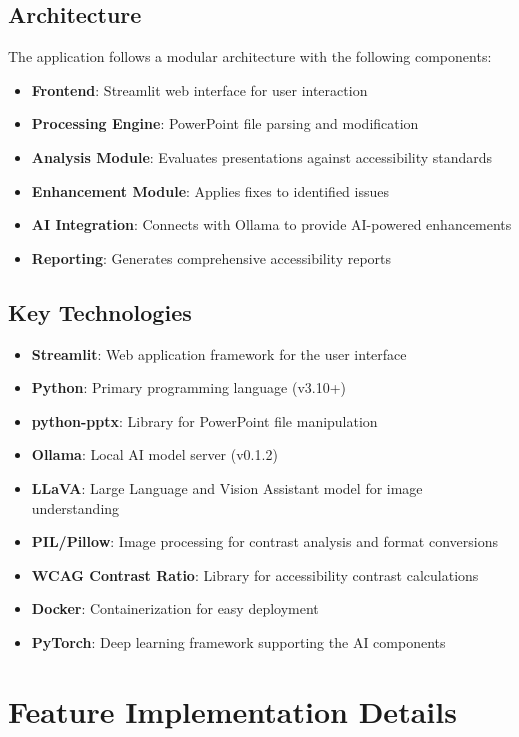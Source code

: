 \documentclass{article}
\begin{document}
\subsection{Architecture}
The application follows a modular architecture with the following components:
\begin{itemize}
    \item \textbf{Frontend}: Streamlit web interface for user interaction
    \item \textbf{Processing Engine}: PowerPoint file parsing and modification
    \item \textbf{Analysis Module}: Evaluates presentations against accessibility standards
    \item \textbf{Enhancement Module}: Applies fixes to identified issues
    \item \textbf{AI Integration}: Connects with Ollama to provide AI-powered enhancements
    \item \textbf{Reporting}: Generates comprehensive accessibility reports
\end{itemize}

\subsection{Key Technologies}
\begin{itemize}
    \item \textbf{Streamlit}: Web application framework for the user interface
    \item \textbf{Python}: Primary programming language (v3.10+)
    \item \textbf{python-pptx}: Library for PowerPoint file manipulation
    \item \textbf{Ollama}: Local AI model server (v0.1.2)
    \item \textbf{LLaVA}: Large Language and Vision Assistant model for image understanding
    \item \textbf{PIL/Pillow}: Image processing for contrast analysis and format conversions
    \item \textbf{WCAG Contrast Ratio}: Library for accessibility contrast calculations
    \item \textbf{Docker}: Containerization for easy deployment
    \item \textbf{PyTorch}: Deep learning framework supporting the AI components
\end{itemize}

\section{Feature Implementation Details}
\end{document}
